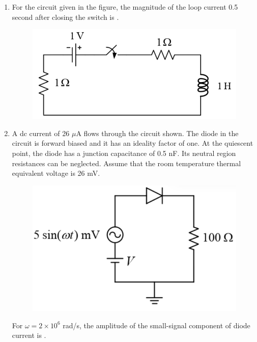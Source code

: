 \documentclass[a4paper, 11pt]{article}
\begin{document}
\begin{enumerate}
    \item For the circuit given in the figure, the magnitude of the loop current  0.5 second after closing the switch is \underline{\hspace{2cm}}.
    \begin{figure}[H]
        \centering
        \includegraphics[width=0.6\columnwidth]{figs/q36.png}
        \caption*{}
        \label{fig:q36}
    \end{figure}

    \hfill{}

    \item A dc current of 26 $\mu$A flows through the circuit shown. The diode in the circuit is forward biased and it has an ideality factor of one. At the quiescent point, the diode has a junction capacitance of 0.5 nF. Its neutral region resistances can be neglected. Assume that the room temperature thermal equivalent voltage is 26 mV.
    \begin{figure}[H]
        \centering
        \includegraphics[width=0.5\columnwidth]{figs/q37.png}
        \caption*{}
        \label{fig:q37}
    \end{figure}
    For $\omega = 2 \times 10^6$ rad/s, the amplitude of the small-signal component of diode current  is \underline{\hspace{2cm}}.

    \hfill{}


\end{enumerate}
\end{document}
